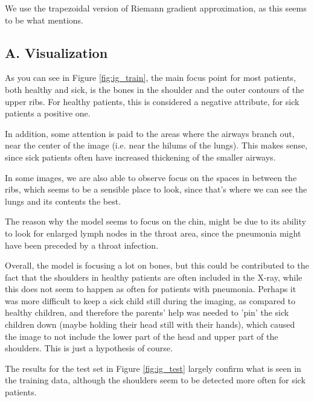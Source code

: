 We use the trapezoidal version of Riemann gradient approximation, as this seems to be what \cite{ig} mentions.

\subsection*{A. Visualization}

As you can see in Figure \ref{fig:ig_train}, the main focus point for most patients, both healthy and sick, is the bones in the shoulder and the outer contours of the upper ribs. For healthy patients, this is considered a negative attribute, for sick patients a positive one.

In addition, some attention is paid to the areas where the airways branch out, near the center of the image (i.e. near the hilums of the lungs). This makes sense, since sick patients often have increased thickening of the smaller airways.

In some images, we are also able to observe focus on the spaces in between the ribs, which seems to be a sensible place to look, since that's where we can see the lungs and its contents the best.

The reason why the model seems to focus on the chin, might be due to its ability to look for enlarged lymph nodes in the throat area, since the pneumonia might have been preceded by a throat infection.

Overall, the model is focusing a lot on bones, but this could be contributed to the fact that the shoulders in healthy patients are often included in the X-ray, while this does not seem to happen as often for patients with pneumonia. Perhaps it was more difficult to keep a sick child still during the imaging, as compared to healthy children, and therefore the parents' help was needed to 'pin' the sick children down (maybe holding their head still with their hands), which caused the image to not include the lower part of the head and upper part of the shoulders. This is just a hypothesis of course.

The results for the test set in Figure \ref{fig:ig_test} largely confirm what is seen in the training data, although the shoulders seem to be detected more often for sick patients.

